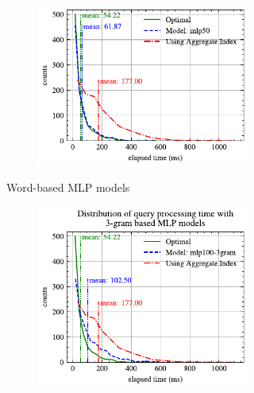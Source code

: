 \begin{figure}[!th]
\begin{subfigure}{0.45\textwidth}
\begin{subfigure}{\textwidth}
			\includegraphics[]{my/graphics/perf_dist_mlp50_B.pdf}
		\end{subfigure}
		\caption{Word-based MLP models}
	\end{subfigure}
	\hfill
	\begin{subfigure}{0.45\textwidth}
		\begin{subfigure}{\textwidth}
			\centering
			\includegraphics[]{my/graphics/perf_dist_mlp100_3gram_B.pdf}
		\end{subfigure}
		\vfill
		\begin{subfigure}{\textwidth}
			\centering

\end{subfigure}
\end{subfigure}
\end{figure}

